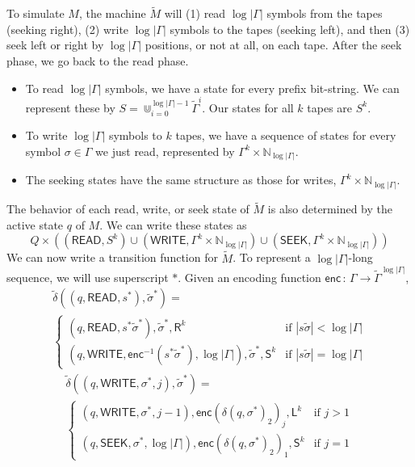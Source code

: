 \documentclass[12pt]{article}
\begin{document}
To simulate $M$, the machine $\tilde{M}$ will (1) read $\log|\Gamma|$ symbols from the tapes (seeking right), (2) write $\log|\Gamma|$ symbols to the tapes (seeking left), and then (3) seek left or right by $\log|\Gamma|$ positions, or not at all, on each tape. After the seek phase, we go back to the read phase.
\begin{itemize}
\item{To read $\log|\Gamma|$ symbols, we have a state for every prefix bit-string. We can represent these by $S = \Cup_{i=0}^{\log|\Gamma| - 1} \tilde{\Gamma}^i$. Our states for all $k$ tapes are $S^k$.}
\item{To write $\log|\Gamma|$ symbols to $k$ tapes, we have a sequence of states for every symbol $\sigma \in \Gamma$ we just read, represented by $\Gamma^k \times \mathbb{N}_{\log|\Gamma|}$.}
\item{The seeking states have the same structure as those for writes, $\Gamma^k \times \mathbb{N}_{\log|\Gamma|}$.}
\end{itemize}
The behavior of each read, write, or seek state of $\tilde{M}$ is also determined by the active state $q$ of $M$. We can write these states as
$$
Q \times \left(
(\textsf{READ}, S^k) \cup
(\textsf{WRITE}, \Gamma^k \times \mathbb{N}_{\log|\Gamma|}) \cup
(\textsf{SEEK}, \Gamma^k \times \mathbb{N}_{\log|\Gamma|})
\right)
$$
We can now write a transition function for $\tilde{M}$. To represent a $\log|\Gamma|$-long sequence, we will use superscript $*$. Given an encoding function $\textsf{enc} \,:\, \Gamma \rightarrow \tilde{\Gamma}^{\log|\Gamma|}$,
\begin{multline*}
\tilde{\delta}
((q, \textsf{READ}, s^*), \tilde{\sigma}^*) = \\
\begin{cases}
(q, \textsf{READ}, s^* \tilde{\sigma}^*), \tilde{\sigma}^*, \textsf{R}^k &
\text{if } |s\tilde{\sigma}| < \log|\Gamma| \\
(q, \textsf{WRITE}, \textsf{enc}^{-1}(s^* \tilde{\sigma}^*), \log|\Gamma|), \tilde{\sigma}^*, \textsf{S}^k &
\text{if } |s\tilde{\sigma}| = \log|\Gamma|
\end{cases}
\end{multline*}
\begin{multline*}
\tilde{\delta}
((q, \textsf{WRITE}, \sigma^*, j), \tilde{\sigma}^*) = \\
\begin{cases}
(q, \textsf{WRITE}, \sigma^*, j-1), \textsf{enc}(\delta(q,\sigma^*)_2)_j, \textsf{L}^k &
\text{if } j > 1 \\
(q, \textsf{SEEK}, \sigma^*, \log|\Gamma|), \textsf{enc}(\delta(q,\sigma^*)_2)_1, \textsf{S}^k &
\text{if } j = 1
\end{cases}
\end{multline*}
\end{document}
